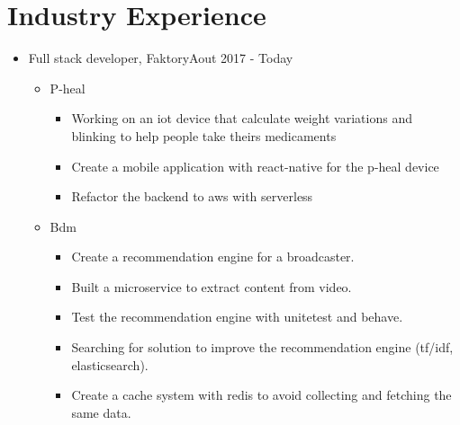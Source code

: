 \documentclass[11pt,letter,sans]{moderncv}
\begin{document}
\hypersetup{linkcolor=color0,urlcolor=color1}
\makecvtitle

\vspace{-7mm}
\section{Industry Experience}
  \begin{itemize}
      \item Full stack developer, Faktory\hfill Aout 2017 - Today
      \begin{itemize}
            \item P-heal 
\begin{itemize}
                \item Working on an iot device that calculate weight variations and blinking to help people take theirs medicaments
              \end{itemize}
\begin{itemize}
                \item Create a mobile application with react-native for the p-heal device
              \end{itemize}
\begin{itemize}
                \item Refactor the backend to aws with serverless
              \end{itemize}
            \item Bdm 
\begin{itemize}
                \item Create a recommendation engine for a broadcaster.
              \end{itemize}
\begin{itemize}
                \item Built a microservice to extract content from video.
              \end{itemize}
\begin{itemize}
                \item Test the recommendation engine with unitetest and behave.
              \end{itemize}
\begin{itemize}
                \item Searching for solution to improve the recommendation engine (tf/idf, elasticsearch).
              \end{itemize}
\begin{itemize}
                \item Create a cache system with redis to avoid collecting and fetching the same data.

\end{itemize}
\end{itemize}
\end{itemize}
\end{document}
